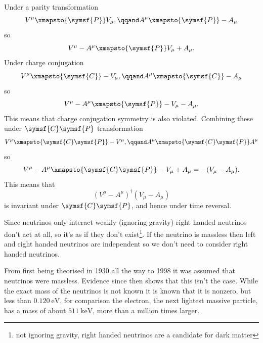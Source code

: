 \documentclass[fleqn]{NotesClass}
\newcommand{\hermit}{\dagger}
\newcommand{\chargeConjugation}{\symsf{C}}
\newcommand{\parity}{\symsf{P}}
\begin{document}
    Under a parity transformation
    \begin{equation}
        V^\mu \xmapsto{\parity} V_\mu, \qqand A^\mu \xmapsto{\parity} -A_\mu
    \end{equation}
    so
    \begin{equation}
        V^\mu - A^\mu \xmapsto{\parity} V_\mu + A_\mu.
    \end{equation}
    Under charge conjugation
    \begin{equation}
        V^\mu \xmapsto{\chargeConjugation} -V_\mu, \qqand A^\mu \xmapsto{\chargeConjugation} -A_\mu
    \end{equation}
    so
    \begin{equation}
        V^\mu - A^\mu \xmapsto{\parity} -V_\mu - A_\mu.
    \end{equation}
    This means that charge conjugation symmetry is also violated.
    Combining these under \(\chargeConjugation\parity\) transformation
    \begin{equation}
        V^\mu \xmapsto{\chargeConjugation\parity} -V^\mu, \qqand A^\mu \xmapsto{\chargeConjugation\parity} A^\mu
    \end{equation}
    so
    \begin{equation}
        V^\mu - A^\mu \xmapsto{\chargeConjugation\parity} -V_\mu + A_\mu = -(V_\mu - A_\mu).
    \end{equation}
    This means that
    \begin{equation}
        (V^\mu - A^\mu)^\hermit (V_\mu - A_\mu)
    \end{equation}
    is invariant under \(\chargeConjugation\parity\), and hence under time reversal.
    
    Since neutrinos only interact weakly (ignoring gravity) right handed neutrinos don't act at all, so it's as if they don't exist\footnote{not ignoring gravity, right handed neutrinos are a candidate for dark matter}.
    If the neutrino is massless then left and right handed neutrinos are independent so we don't need to consider right handed neutrinos.
    
    From first being theorised in 1930 all the way to 1998 it was assumed that neutrinos were massless.
    Evidence since then shows that this isn't the case.
    While the exact mass of the neutrinos is not known it is known that it is nonzero, but less than \(\qty{0.120}{\electronvolt}\), for comparison the electron, the next lightest massive particle, has a mass of about \(\qty{511}{\kilo\electronvolt}\), more than a million times larger.
    
\end{document}
